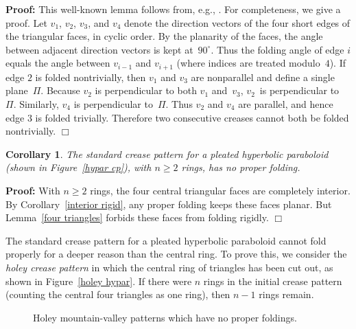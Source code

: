 \documentclass[11pt,letterpaper]{article}
\newtheorem{corollary}[theorem]{Corollary}
\newenvironment{proof}{\noindent\textbf{Proof: }\ignorespaces}
  {\hspace*{\fill}$\Box$\medskip}
\newcommand\term[1]{\emph{#1}}
\begin{document}
\begin{proof}
  This well-known lemma follows from,
  e.g., \cite[Lemma~9]{Donoso-O'Rourke-2002}.
  For completeness, we give a proof.
  Let $v_1$, $v_2$, $v_3$, and $v_4$ denote the direction vectors
  of the four short edges of the triangular faces, in cyclic order.
  By the planarity of the faces,
  the angle between adjacent direction vectors is kept at~$90^\circ$.
  Thus the folding angle of edge $i$ equals the angle
  between $v_{i-1}$ and $v_{i+1}$ (where indices are treated modulo~$4$).
  If edge $2$ is folded nontrivially, then
  $v_1$ and $v_3$ are nonparallel and define a single plane~$\Pi$.
  Because $v_2$ is perpendicular to both $v_1$ and~$v_3$,
  $v_2$~is perpendicular to~$\Pi$.
  Similarly, $v_4$ is perpendicular to~$\Pi$.
  Thus $v_2$ and $v_4$ are parallel,
  and hence edge $3$ is folded trivially.
  Therefore two consecutive creases cannot both be folded nontrivially.
\end{proof}

\begin{corollary} \label{hypar center}
  The standard crease pattern for a pleated hyperbolic paraboloid
  (shown in Figure~\ref{hypar cp}), with $n \geq 2$ rings,
  has no proper folding.
\end{corollary}

\begin{proof}
  With $n \geq 2$ rings, the four central triangular faces are completely
  interior.  By Corollary~\ref{interior rigid}, any proper folding
  keeps these faces planar.  But Lemma~\ref{four triangles} forbids
  these faces from folding rigidly.
\end{proof}

The standard crease pattern for a pleated hyperbolic paraboloid
cannot fold properly for a deeper reason than the central ring.
To prove this, we consider the \term{holey crease pattern}
in which the central ring of triangles has been cut out,
as shown in Figure~\ref{holey hypar}.
If there were $n$ rings in the initial crease pattern
(counting the central four triangles as one ring), then $n-1$ rings remain.

\begin{figure}
  \centering
  \hfil\hfil
  \caption{Holey mountain-valley patterns which have no proper foldings.}
  \label{holey}
\end{figure}
\end{document}

